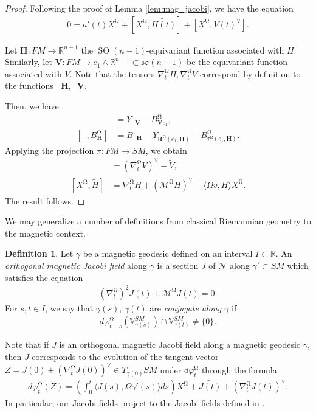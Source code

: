 \documentclass[12pt]{amsart}
\numberwithin{numbering}{section}
\theoremstyle{plain}
\theoremstyle{definition}
\newtheorem{df}[numbering]{Definition}
\theoremstyle{remark}
\numberwithin{equation}{section}
\DeclareMathOperator{\SO}{SO}
\DeclareMathOperator{\xs}{\mathbb{X}^{\mg}}
\DeclareMathOperator{\mg}{\Omega}
\newcommand{\rsfm}{\mathbf{R}^{\mg}}
\newcommand{\R}{\mathbb{R}}
\newcommand{\frk}[1]{\mathfrak{#1}}
\begin{document}
\begin{proof}
Following the proof of Lemma \ref{lem:mag_jacobi}, we have the equation
\begin{align*}
0 = a'(t) X^{\mg} + [X^{\mg}, \widetilde{H(t)}] + [X^{\mg}, V(t)^\vee].
\end{align*}

Let $\mathbf{H}: FM \to \R^{n-1}$ the $\SO(n-1)$-equivariant function associated with $H$. Similarly, let $\mathbf{V}: FM \to e_1 \wedge \R^{n-1} \subset \frk{so}(n-1)$ be the equivariant function associated with $V$. Note that the tensors $\nabla_t^{\mg} H, \nabla_t^{\mg} V$ correspond by definition to the functions $\xs \mathbf{H}, \xs \mathbf{V}$.

Then, we have 
\begin{align*}
[\xs, Y_{\mathbf{V}}] &= Y_{\xs \mathbf{V}} - B^{\mg}_{\mathbf{V} e_1}, \\ 
[\xs, B_{\mathbf{H}}^{\mg}] &= B_{\xs \mathbf{H}} - Y_{\rsfm(e_1, \mathbf{H})} - B^{\mg}_{\tau^{\mg}(e_1, \mathbf{H})}.
\end{align*}
Applying the projection $\pi: FM \to SM$, we obtain 
\begin{align*}
[X^{\mg}, V^\vee] &= (\nabla_t^{\mg} V)^\vee - \widetilde{V}, \\ 
[X^{\mg}, \widetilde{H}] &= \widetilde{\nabla_t^{\mg} H} + (\mathcal{M}^{\mg} H)^\vee - \langle \Omega v, H \rangle X^{\mg}.
\end{align*}
The result follows.
\end{proof}

We may generalize a number of definitions from classical Riemannian geometry to the magnetic context. 
\begin{df}
Let $\gamma$ be a magnetic geodesic defined on an interval $I \subset \R$. An \emph{orthogonal magnetic Jacobi field} along $\gamma$ is a section $J$ of $\mathcal{N}$ along $\gamma' \subset SM$ which satisfies the equation 
\begin{align*}
(\nabla_{t}^{\mg})^2 J(t) + \mathcal{M}^{\mg} J(t) = 0.
\end{align*}
For $s, t \in I$, we say that $\gamma(s)$, $\gamma(t)$ are \emph{conjugate along $\gamma$} if 
\begin{align*}
d\varphi_{t-s}^{\mg} (\mathbb{V}^{SM}_{\gamma(s)}) \cap \mathbb{V}^{SM}_{\gamma(t)} \neq \{0\}.
\end{align*}
\end{df}

Note that if $J$ is an orthogonal magnetic Jacobi field along a magnetic geodesic $\gamma$, then $J$ corresponds to the evolution of the tangent vector $Z = \widetilde{J(0)} + (\nabla_t^{\mg} J(0))^\vee \in T_{\gamma(0)} SM$ under $d\varphi_t^{\mg}$ through the formula
\begin{align*}
d\varphi_t^{\mg}(Z) = \left ( \int_0^t \langle J(s), \Omega \gamma'(s) \rangle ds \right ) X^{\mg} + \widetilde{J(t)} + (\nabla_t^{\mg} J(t))^\vee.
\end{align*}
In particular, our Jacobi fields project to the Jacobi fields defined in \cite{assenza2025hopf}. 
\end{document}
